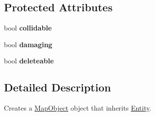 \subsection*{Protected Attributes}
\begin{DoxyCompactItemize}
\item 
\hypertarget{class_map_object_a1d900ea8b9825881d5116711569b5e11}{bool {\bfseries collidable}}\label{class_map_object_a1d900ea8b9825881d5116711569b5e11}

\item 
\hypertarget{class_map_object_aa7f81dc2db7b5cdf0267717dee175d62}{bool {\bfseries damaging}}\label{class_map_object_aa7f81dc2db7b5cdf0267717dee175d62}

\item 
\hypertarget{class_map_object_a9c72b4c12be7a1b9c26adb3cfa10f029}{bool {\bfseries deleteable}}\label{class_map_object_a9c72b4c12be7a1b9c26adb3cfa10f029}

\end{DoxyCompactItemize}


\subsection{Detailed Description}
Creates a \hyperlink{class_map_object}{Map\+Object} object that inherits \hyperlink{class_entity}{Entity}. 

